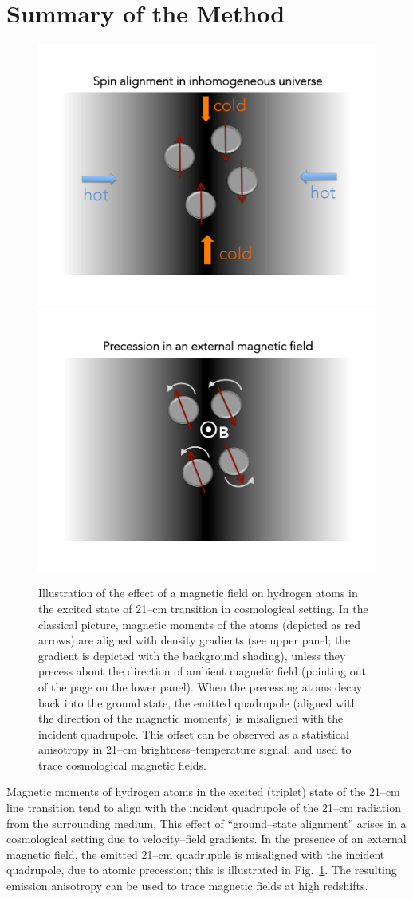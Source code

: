 \section{Summary of the Method}
\label{sec:method}
\begin{figure}
\centering
\includegraphics[width=.45\textwidth,keepaspectratio=true]{spin_aligned.pdf}
\includegraphics[width=.45\textwidth,keepaspectratio=true]{precession.pdf}
\caption{Illustration of the effect of a magnetic field on hydrogen atoms in the excited state of 21--cm transition in cosmological setting. In the classical picture, magnetic moments of the atoms (depicted as red arrows) are aligned with density gradients (see upper panel; the gradient is depicted with the background shading), unless they precess about the direction of ambient magnetic field (pointing out of the page on the lower panel). When the precessing atoms decay back into the ground state, the emitted quadrupole (aligned with the direction of the magnetic moments) is misaligned with the incident quadrupole. This offset can be observed as a statistical anisotropy in 21--cm brightness--temperature signal, and used to trace cosmological magnetic fields.\label{fig:precession}}
\end{figure}
Magnetic moments of hydrogen atoms in the excited (triplet) state of the 21--cm line transition tend to align with the incident quadrupole of the 21--cm radiation from the surrounding medium. This effect of ``ground--state alignment'' \cite{Yan08,Yan12} arises in a cosmological setting due to velocity--field gradients. In the presence of an external magnetic field, the emitted 21--cm quadrupole is misaligned with the incident quadrupole, due to atomic precession; this is illustrated in Fig.~\ref{fig:precession}. The resulting emission anisotropy can be used to trace magnetic fields at high redshifts.


